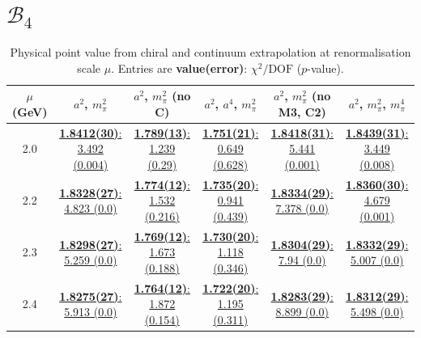 \documentclass[12pt]{extarticle}
\begin{document}
\section{$\mathcal{B}_4$}
\begin{table}[h!]
\begin{center}
\begin{tabular}{|c|c|c|c|c|c|}
\hline
$\mu$ (GeV) & $a^2$, $m_\pi^2$& $a^2$, $m_\pi^2$ (no C)& $a^2$, $a^4$, $m_\pi^2$& $a^2$, $m_\pi^2$ (no M3, C2)& $a^2$, $m_\pi^2$, $m_\pi^4$\\
\hline
2.0& \hyperlink{SSpPP/SUSY/a2m2_20.pdf.1}{\textbf{1.8412(30)}: 3.492 (0.004)} & \hyperlink{SSpPP/SUSY/a2m2noC_20.pdf.1}{\textbf{1.789(13)}: 1.239 (0.29)} & \hyperlink{SSpPP/SUSY/a2a4m2_20.pdf.1}{\textbf{1.751(21)}: 0.649 (0.628)} & \hyperlink{SSpPP/SUSY/a2m2mcut_20.pdf.1}{\textbf{1.8418(31)}: 5.441 (0.001)} & \hyperlink{SSpPP/SUSY/a2m2m4_20.pdf.1}{\textbf{1.8439(31)}: 3.449 (0.008)}\\
2.2& \hyperlink{SSpPP/SUSY/a2m2_22.pdf.1}{\textbf{1.8328(27)}: 4.823 (0.0)} & \hyperlink{SSpPP/SUSY/a2m2noC_22.pdf.1}{\textbf{1.774(12)}: 1.532 (0.216)} & \hyperlink{SSpPP/SUSY/a2a4m2_22.pdf.1}{\textbf{1.735(20)}: 0.941 (0.439)} & \hyperlink{SSpPP/SUSY/a2m2mcut_22.pdf.1}{\textbf{1.8334(29)}: 7.378 (0.0)} & \hyperlink{SSpPP/SUSY/a2m2m4_22.pdf.1}{\textbf{1.8360(30)}: 4.679 (0.001)}\\
2.3& \hyperlink{SSpPP/SUSY/a2m2_23.pdf.1}{\textbf{1.8298(27)}: 5.259 (0.0)} & \hyperlink{SSpPP/SUSY/a2m2noC_23.pdf.1}{\textbf{1.769(12)}: 1.673 (0.188)} & \hyperlink{SSpPP/SUSY/a2a4m2_23.pdf.1}{\textbf{1.730(20)}: 1.118 (0.346)} & \hyperlink{SSpPP/SUSY/a2m2mcut_23.pdf.1}{\textbf{1.8304(29)}: 7.94 (0.0)} & \hyperlink{SSpPP/SUSY/a2m2m4_23.pdf.1}{\textbf{1.8332(29)}: 5.007 (0.0)}\\
2.4& \hyperlink{SSpPP/SUSY/a2m2_24.pdf.1}{\textbf{1.8275(27)}: 5.913 (0.0)} & \hyperlink{SSpPP/SUSY/a2m2noC_24.pdf.1}{\textbf{1.764(12)}: 1.872 (0.154)} & \hyperlink{SSpPP/SUSY/a2a4m2_24.pdf.1}{\textbf{1.722(20)}: 1.195 (0.311)} & \hyperlink{SSpPP/SUSY/a2m2mcut_24.pdf.1}{\textbf{1.8283(29)}: 8.899 (0.0)} & \hyperlink{SSpPP/SUSY/a2m2m4_24.pdf.1}{\textbf{1.8312(29)}: 5.498 (0.0)}\\
\hline
\end{tabular}
\caption{Physical point value from chiral and continuum extrapolation at renormalisation scale $\mu$. Entries are \textbf{value(error)}: $\chi^2/\text{DOF}$ ($p$-value).}
\end{center}
\end{table}
\end{document}
